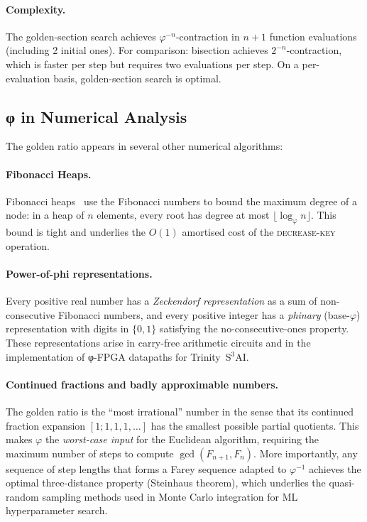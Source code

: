 \paragraph{Complexity.}
The golden-section search achieves
\(\varphi^{-n}\)-contraction in \(n+1\) function evaluations
(including 2 initial ones).  For comparison:
bisection achieves \(2^{-n}\)-contraction, which is
faster per step but requires two evaluations per step.
On a per-evaluation basis, golden-section search is optimal.

\subsection{φ in Numerical Analysis}
\label{subsec:gh-numerical-analysis}

The golden ratio appears in several other numerical algorithms:

\paragraph{Fibonacci Heaps.}
Fibonacci heaps~\cite{cormen2022introduction} use the Fibonacci
numbers to bound the maximum degree of a node: in a heap of \(n\)
elements, every root has degree at most \(\lfloor\log_\varphi n\rfloor\).
This bound is tight and underlies the \(O(1)\) amortised cost of the
\textsc{decrease-key} operation.

\paragraph{Power-of-phi representations.}
Every positive real number has a \emph{Zeckendorf representation} as a
sum of non-consecutive Fibonacci numbers, and every positive integer
has a \emph{phinary} (base-\(\varphi\)) representation with digits in
\(\{0,1\}\) satisfying the no-consecutive-ones property.
These representations arise in carry-free arithmetic circuits and
in the implementation of φ-FPGA datapaths for Trinity~S$^3$AI.

\paragraph{Continued fractions and badly approximable numbers.}
The golden ratio is the ``most irrational'' number in the sense that
its continued fraction expansion \([1;1,1,1,\ldots]\) has the smallest
possible partial quotients.  This makes \(\varphi\) the
\emph{worst-case input} for the Euclidean algorithm, requiring
the maximum number of steps to compute \(\gcd(F_{n+1}, F_n)\).
More importantly, any sequence of step lengths that forms a Farey
sequence adapted to \(\varphi^{-1}\) achieves the optimal
three-distance property (Steinhaus theorem), which underlies the
quasi-random sampling methods used in Monte Carlo integration for
ML hyperparameter search.

